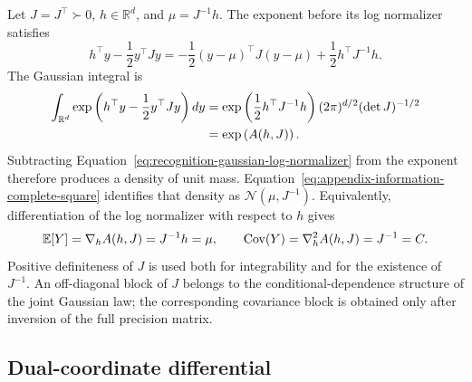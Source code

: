 Let \(J=J^\top\succ0\), \(h\in\mathbb R^d\), and \(\mu=J^{-1}h\). The exponent before its log normalizer satisfies
\begin{equation}
h^\top y-\frac12y^\top Jy
=-\frac12(y-\mu)^\top J(y-\mu)
+\frac12h^\top J^{-1}h.
\label{eq:appendix-information-complete-square}
\end{equation}
The Gaussian integral is
\begin{align}
\int_{\mathbb R^d}
\exp\left(h^\top y-\frac12y^\top Jy\right)dy
&=\exp\left(\frac12h^\top J^{-1}h\right)
(2\pi)^{d/2}(\det J)^{-1/2}\notag\\
&=\exp\left(A(h,J)\right).
\label{eq:appendix-information-normalizer-integral}
\end{align}
Subtracting Equation~\eqref{eq:recognition-gaussian-log-normalizer} from the exponent therefore produces a density of unit mass. Equation~\eqref{eq:appendix-information-complete-square} identifies that density as \(\mathcal N(\mu,J^{-1})\). Equivalently, differentiation of the log normalizer with respect to \(h\) gives
\begin{equation}
\mathbb E[Y]=\nabla_h A(h,J)=J^{-1}h=\mu,
\qquad
\operatorname{Cov}(Y)=\nabla_h^2A(h,J)=J^{-1}=C.
\label{eq:appendix-information-moment-derivatives}
\end{equation}
Positive definiteness of \(J\) is used both for integrability and for the existence of \(J^{-1}\). An off-diagonal block of \(J\) belongs to the conditional-dependence structure of the joint Gaussian law; the corresponding covariance block is obtained only after inversion of the full precision matrix.

\subsection{Dual-coordinate differential}
\label{sec:gaussian-dual-coordinate-proof}

